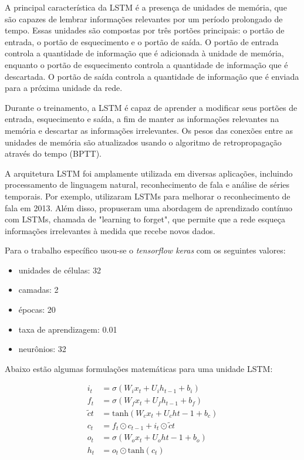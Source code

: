 A principal característica da LSTM é a presença de unidades de memória, que são capazes de lembrar informações relevantes por um período prolongado de tempo. Essas unidades são compostas por três portões principais: o portão de entrada, o portão de esquecimento e o portão de saída. O portão de entrada controla a quantidade de informação que é adicionada à unidade de memória, enquanto o portão de esquecimento controla a quantidade de informação que é descartada. O portão de saída controla a quantidade de informação que é enviada para a próxima unidade da rede.

Durante o treinamento, a LSTM é capaz de aprender a modificar seus portões de entrada, esquecimento e saída, a fim de manter as informações relevantes na memória e descartar as informações irrelevantes. Os pesos das conexões entre as unidades de memória são atualizados usando o algoritmo de retropropagação através do tempo (BPTT).

A arquitetura LSTM foi amplamente utilizada em diversas aplicações, incluindo processamento de linguagem natural, reconhecimento de fala e análise de séries temporais. Por exemplo, \cite{graves2013speech} utilizaram LSTMs para melhorar o reconhecimento de fala em 2013. Além disso, \cite{gers1999learning} propuseram uma abordagem de aprendizado contínuo com LSTMs, chamada de "learning to forget", que permite que a rede esqueça informações irrelevantes à medida que recebe novos dados.

Para o trabalho específico usou-se o \textit{tensorflow keras} com os seguintes valores:

\begin{itemize}
    \item unidades de células: 32
    \item camadas: 2
    \item épocas: 20
    \item taxa de aprendizagem: 0.01
    \item neurônios: 32
\end{itemize}

Abaixo estão algumas formulações matemáticas para uma unidade LSTM:

\begin{equation}
    \begin{aligned}
        i_t        & = \sigma(W_i x_t + U_i h_{t-1} + b_i)      \\
        f_t        & = \sigma(W_f x_t + U_f h_{t-1} + b_f)      \\
        \tilde{c}t & = \text{tanh}(W_c x_t + U_c h{t-1} + b_c)  \\
        c_t        & = f_t \odot c_{t-1} + i_t \odot \tilde{c}t \\
        o_t        & = \sigma(W_o x_t + U_o h{t-1} + b_o)       \\
        h_t        & = o_t \odot \text{tanh}(c_t)
    \end{aligned}
\end{equation}

